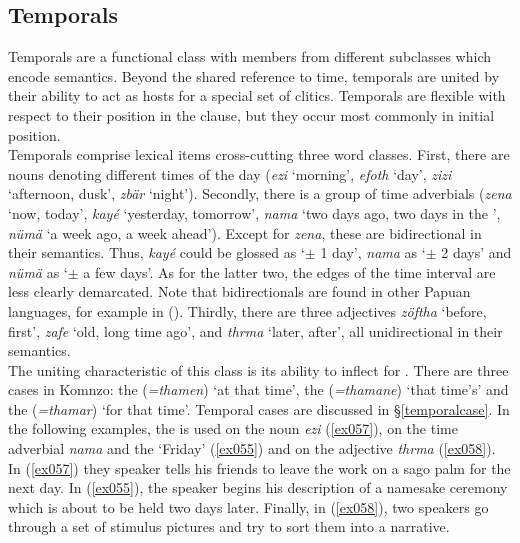 \subsection{Temporals} \label{temporals}

Temporals are a functional class with members from different  subclasses which encode  semantics. Beyond the shared reference to time, temporals are united by their ability to act as hosts for a special set of   clitics. Temporals are flexible with respect to their position in the clause, but they occur most commonly in initial position.\\

Temporals comprise lexical items cross-cutting three word classes. First, there are nouns denoting different times of the day (\emph{ezi} `morning', \emph{efoth} `day', \emph{zizi} `afternoon, dusk', \emph{zbär} `night'). Secondly, there is a group of time adverbials (\emph{zena} `now, today', \emph{kayé} `yesterday, tomorrow', \emph{nama} `two days ago, two days in the ', \emph{nümä} `a week ago, a week ahead'). Except for \emph{zena}, these are bidirectional in their semantics. Thus, \emph{kayé} could be glossed as `$\pm$ 1 day', \emph{nama} as `$\pm$ 2 days' and \emph{nümä} as `$\pm$ a few days'. As for the latter two, the edges of the time interval are less clearly demarcated. Note that bidirectionals are found in other Papuan languages, for example in  (\citealt[70]{Reesink:1987vg}). Thirdly, there are three adjectives \emph{zöftha} `before, first', \emph{zafe} `old, long time ago', and \emph{thrma} `later, after', all unidirectional in their semantics.\\

The uniting characteristic of this class is its ability to inflect for  . There are three  cases in Komnzo: the   (\emph{=thamen}) `at that time', the   (\emph{=thamane}) `that time's' and the   (\emph{=thamar}) `for that time'. Temporal cases are discussed in \S{}\ref{temporalcase}. In the following examples, the    is used on the noun \emph{ezi} (\ref{ex057}), on the time adverbial \emph{nama} and the   `Friday' (\ref{ex055}) and on the  adjective \emph{thrma} (\ref{ex058}). In (\ref{ex057}) they speaker tells his friends to leave the work on a sago palm for the next day. In (\ref{ex055}), the speaker begins his description of a namesake ceremony which is about to be held two days later. Finally, in (\ref{ex058}), two speakers go through a set of stimulus pictures and try to sort them into a narrative.

